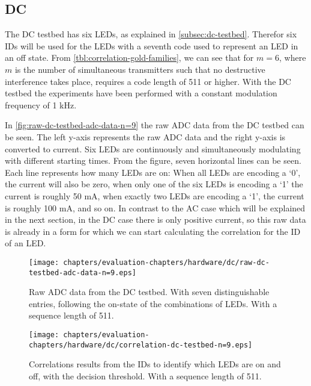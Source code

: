 
\subsection{DC}
\label{subsec:dc-testbed-eval}

The DC testbed has six LEDs, as explained in \autoref{subsec:dc-testbed}.
Therefor six IDs will be used for the LEDs with a seventh code used to represent an LED in an off state.
From \autoref{tbl:correlation-gold-families}, we can see that for $m = 6$, where $m$ is the number of simultaneous transmitters such that no destructive interference takes place, requires a code length of 511 or higher.
With the DC testbed the experiments have been performed with a constant modulation frequency of 1 kHz.

In \autoref{fig:raw-dc-testbed-adc-data-n=9} the raw ADC data from the DC testbed can be seen.
The left y-axis represents the raw ADC data and the right y-axis is converted to current.
Six LEDs are continuously and simultaneously modulating with different starting times.
From the figure, seven horizontal lines can be seen.
Each line represents how many LEDs are on: When all LEDs are encoding a `0', the current will also be zero, when only one of the six LEDs is encoding a `1' the current is roughly 50 mA, when exactly two LEDs are encoding a `1', the current is roughly 100 mA, and so on.
In contrast to the AC case which will be explained in the next section, in the DC case there is only positive current, so this raw data is already in a form for which we can start calculating the correlation for the ID of an LED.

\begin{figure}[t]
  \centering
  \begin{minipage}[b]{0.49\textwidth}
    \texttt{[image: chapters/evaluation-chapters/hardware/dc/raw-dc-testbed-adc-data-n=9.eps]}
    \caption{Raw ADC data from the DC testbed. With seven distinguishable entries, following the on-state of the combinations of LEDs. With a sequence length of 511.}
    \label{fig:raw-dc-testbed-adc-data-n=9}
  \end{minipage}
  \hfill
  \begin{minipage}[b]{0.49\textwidth}
    \texttt{[image: chapters/evaluation-chapters/hardware/dc/correlation-dc-testbed-n=9.eps]}
    \caption{Correlations results from the IDs to identify which LEDs are on and off, with the decision threshold. With a sequence length of 511.}
    \label{fig:correlation-dc-testbed-n=9}
  \end{minipage}
\end{figure}


